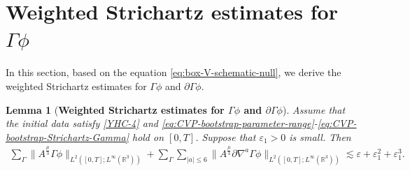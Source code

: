 \documentclass[11pt,twoside]{article}
\def\p{\partial}
\def\ve{\varepsilon}
\def\ls{\lesssim}
\theoremstyle{plain}
\newtheorem{lemma}[theorem]{Lemma}
\theoremstyle{definition}
\theoremstyle{assumption}
\numberwithin{equation}{section}
\begin{document}
	
	
	
	\section{Weighted Strichartz estimates for $\Gamma\phi$}
	\label{sec:weighted-Strichartz-estimates}
	
	In this section, based on  the equation \eqref{eq:box-V-schematic-null}, we derive  the weighted
Strichartz estimates for $\Gamma\phi$ and $\p\Gamma\phi$.

	
	
		\begin{lemma}[{\bf Weighted Strichartz estimates for $\Gamma\phi$ and
	$\p\Gamma\phi$}]
		\label{lem:CVP-weighted-Strichartz-Gamma-closure}
		Assume that the initial data satisfy \eqref{YHC-4} and
		\eqref{eq:CVP-bootstrap-parameter-range}-\eqref{eq:CVP-bootstrap-Strichartz-Gamma}
		hold on \([0,T]\). Suppose that \(\ve_1>0\) is small. Then
		\begin{equation}
			\label{eq:CVP-weighted-Strichartz-Gamma-conclusion}
			\begin{aligned}
			\sum_{\Gamma}
			\big\|
			A^{\frac{\mu}{3}}
			\Gamma\phi
			\big\|_{L^2([0,T];L^\infty(\mathbb R^3))}
			+
			\sum_{\Gamma}
			\sum_{|a|\le 6}
			\big\|
			A^{\frac{\mu}{3}}
			\partial\nabla^a\Gamma\phi
			\big\|_{L^2([0,T];L^\infty(\mathbb R^3))}
				\ls
				\ve+\ve_1^2+\ve_1^3.
			\end{aligned}
		\end{equation}
		\end{lemma}
	
\end{document}
